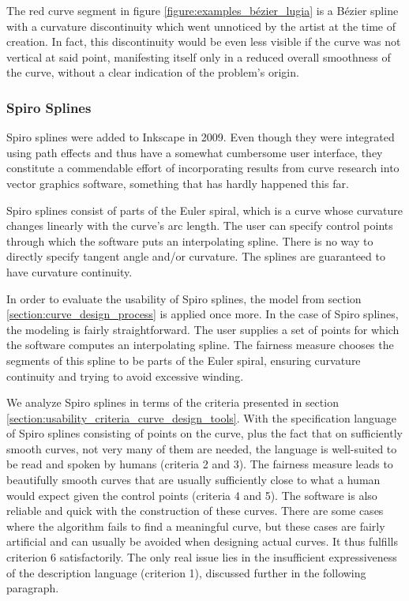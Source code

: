 \documentclass[a4paper]{article}
\begin{document}
				The red curve segment in figure \ref{figure:examples_bézier_lugia} is a Bézier spline with a curvature discontinuity which went unnoticed by the artist at the time of creation. In fact, this discontinuity would be even less visible if the curve was not vertical at said point, manifesting itself only in a reduced overall smoothness of the curve, without a clear indication of the problem's origin.

			\subsubsection{Spiro Splines}
			\label{section:spiro_splines}

				Spiro splines \cite{thesis-spiro} were added to Inkscape in 2009. Even though they were integrated using path effects and thus have a somewhat cumbersome user interface, they constitute a commendable effort of incorporating results from curve research into vector graphics software, something that has hardly happened this far.

				Spiro splines consist of parts of the Euler spiral, which is a curve whose curvature changes linearly with the curve's arc length. The user can specify control points through which the software puts an interpolating spline. There is no way to directly specify tangent angle and/or curvature. The splines are guaranteed to have curvature continuity.

				In order to evaluate the usability of Spiro splines, the model from section \ref{section:curve_design_process} is applied once more. In the case of Spiro splines, the modeling is fairly straightforward. The user supplies a set of points for which the software computes an interpolating spline. The fairness measure chooses the segments of this spline to be parts of the Euler spiral, ensuring curvature continuity and trying to avoid excessive winding.

				We analyze Spiro splines in terms of the criteria presented in section \ref{section:usability_criteria_curve_design_tools}. With the specification language of Spiro splines consisting of points on the curve, plus the fact that on sufficiently smooth curves, not very many of them are needed, the language is well-suited to be read and spoken by humans (criteria 2 and 3). The fairness measure leads to beautifully smooth curves that are usually sufficiently close to what a human would expect given the control points (criteria 4 and 5). The software is also reliable and quick with the construction of these curves. There are some cases where the algorithm fails to find a meaningful curve, but these cases are fairly artificial and can usually be avoided when designing actual curves. It thus fulfills criterion 6 satisfactorily. The only real issue lies in the insufficient expressiveness of the description language (criterion 1), discussed further in the following paragraph.
\end{document}

